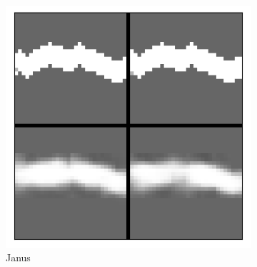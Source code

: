 \begin{figure}[t!]
	\centering
	\begin{subfigure}{0.6\columnwidth}
		\centering
		\includegraphics[width=\linewidth]{img/janus_tunnel_recon.png}
		\caption{Janus}
		\label{subfig:janus_reconstruction}
	\end{subfigure}%
	~ 
	\begin{subfigure}{0.3\columnwidth}
		\centering

\end{subfigure}
\end{figure}
